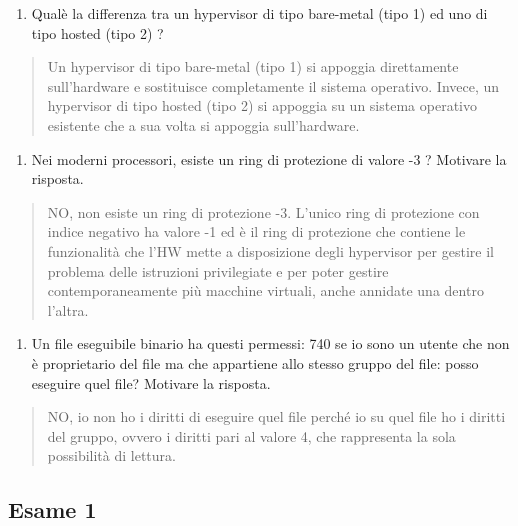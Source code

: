 \begin{enumerate}
\def\labelenumi{\arabic{enumi}.}
\setcounter{enumi}{7}
\item
  Qual\textquotesingle è la differenza tra un hypervisor di tipo
  bare-metal (tipo 1) ed uno di tipo hosted (tipo 2) ?
\end{enumerate}

\begin{quote}
Un hypervisor di tipo bare-metal (tipo 1) si appoggia direttamente
sull'hardware e sostituisce completamente il sistema operativo. Invece,
un hypervisor di tipo hosted (tipo 2) si appoggia su un sistema
operativo esistente che a sua volta si appoggia sull'hardware.
\end{quote}

\begin{enumerate}
\def\labelenumi{\arabic{enumi}.}
\setcounter{enumi}{8}
\item
  Nei moderni processori, esiste un ring di protezione di valore -3 ?
  Motivare la risposta.
\end{enumerate}

\begin{quote}
NO, non esiste un ring di protezione -3. L'unico ring di protezione con
indice negativo ha valore -1 ed è il ring di protezione che contiene le
funzionalità che l'HW mette a disposizione degli hypervisor per gestire
il problema delle istruzioni privilegiate e per poter gestire
contemporaneamente più macchine virtuali, anche annidate una dentro
l'altra.
\end{quote}

\begin{enumerate}
\def\labelenumi{\arabic{enumi}.}
\setcounter{enumi}{9}
\item
  Un file eseguibile binario ha questi permessi: 740 se io sono un
  utente che non è proprietario del file ma che appartiene allo stesso
  gruppo del file: posso eseguire quel file? Motivare la risposta.
\end{enumerate}

\begin{quote}
NO, io non ho i diritti di eseguire quel file perché io su quel file ho
i diritti del gruppo, ovvero i diritti pari al valore 4, che rappresenta
la sola possibilità di lettura.
\end{quote}

\subsection{Esame 1}\label{esame-1}


